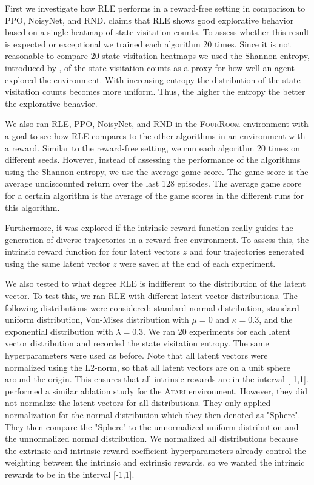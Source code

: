 \documentclass[10pt]{article} %
\begin{document}
First we investigate how RLE performs in a reward-free setting in comparison to PPO, NoisyNet, and RND. \cite{rle-paper} claims that RLE shows good explorative behavior based on a single heatmap of state visitation counts. To assess whether this result is expected or exceptional we trained each algorithm 20 times. Since it is not reasonable to compare 20 state visitation heatmaps we used the Shannon entropy, introduced by \cite{shannon-entropy-paper}, of the state visitation counts as a proxy for how well an agent explored the environment. With increasing entropy the distribution of the state visitation counts becomes more uniform. Thus, the higher the entropy the better the explorative behavior. 

We also ran RLE, PPO, NoisyNet, and RND in the \textsc{FourRoom} environment with a goal to see how RLE compares to the other algorithms in an environment with a reward. Similar to the reward-free setting, we run each algorithm 20 times on different seeds. However, instead of assessing the performance of the algorithms using the Shannon entropy, we use the average game score. The game score is the average undiscounted return over the last 128 episodes. The average game score for a certain algorithm is the average of the game scores in the different runs for this algorithm.

Furthermore, it was explored if the intrinsic reward function really guides the generation of diverse trajectories in a reward-free environment. To assess this, the intrinsic reward function for four latent vectors $z$ and four trajectories generated using the same latent vector $z$ were saved at the end of each experiment. 

We also tested to what degree RLE is indifferent to the distribution of the latent vector. To test this, we ran RLE with different latent vector distributions. The following distributions were considered: standard normal distribution, standard uniform distribution, Von-Mises distribution with $\mu=0$ and $\kappa=0.3$, and the exponential distribution with $\lambda=0.3$. We ran 20 experiments for each latent vector distribution and recorded the state visitation entropy. The same hyperparameters were used as before. Note that all latent vectors were normalized using the L2-norm, so that all latent vectors are on a unit sphere around the origin. This ensures that all intrinsic rewards are in the interval [-1,1]. \cite{rle-paper} performed a similar ablation study for the \textsc{Atari} environment. However, they did not normalize the latent vectors for all distributions. They only applied normalization for the normal distribution which they then denoted as "Sphere". They then compare the "Sphere" to the unnormalized uniform distribution and the unnormalized normal distribution. We normalized all distributions because the extrinsic and intrinsic reward coefficient hyperparameters already control the weighting between the intrinsic and extrinsic rewards, so we wanted the intrinsic rewards to be in the interval [-1,1].
\end{document}
